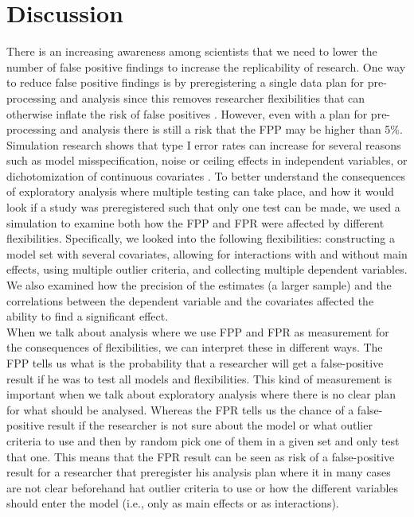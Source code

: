 \section{Discussion}
There is an increasing awareness among scientists that we need to  lower the number of false positive findings to increase the replicability of research. One way to reduce false positive findings is by preregistering a single data plan for pre-processing and analysis since this removes researcher flexibilities that can otherwise inflate the risk of false positives \citep{Simmons2018}. However, even with a plan for pre-processing and analysis there is still a risk that the FPP may be higher than 5\%. Simulation research shows that type I error rates can increase for several reasons such as model misspecification, noise or ceiling effects in independent variables, or dichotomization of continuous covariates \citep{Dennis2019, Litiere2007, Brunner2009, Austin2003, Austin2004}. To better understand the consequences of exploratory analysis where multiple testing can take place, and how it would look if a study was preregistered such that only one test can be made, we used a simulation to examine both how the FPP and FPR were affected by different flexibilities. Specifically, we looked into the following flexibilities: constructing a model set with several covariates, allowing for interactions with and without main effects, using multiple outlier criteria, and collecting multiple dependent variables. We also examined how the precision of the estimates (a larger sample) and the correlations between the dependent variable and the covariates affected the ability to find a significant effect. \\

When we talk about analysis where we use FPP and FPR as measurement for the consequences of flexibilities, we can interpret these in different ways. The FPP tells us what is the probability that a researcher will get a false-positive result if he was to test all models and flexibilities. This kind of measurement is important when we talk about exploratory analysis where there is no clear plan for what should be analysed. Whereas the FPR tells us the chance of a false-positive result if the researcher is not sure about the model or what outlier criteria to use and then by random pick one of them in a given set and only test that one. This means that the FPR result can be seen as risk of a  false-positive result for a researcher that preregister his analysis plan where it in many cases are not clear beforehand hat outlier criteria to use or how the different variables should enter the model (i.e., only as main effects or as interactions).\\ 

